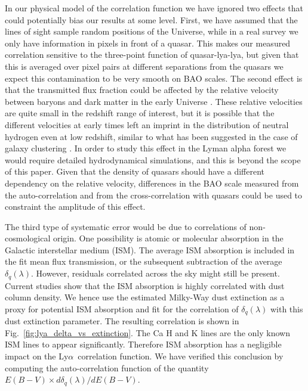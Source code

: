\documentclass{aa}
\newcommand{\dqlam}{\delta_q(\lambda)}
\newcommand{\Lya}{Ly$\alpha$~}
\begin{document}
In our physical model of the correlation function
we have ignored two effects that could potentially bias our results
at some level.
First, we have assumed that the lines of sight sample random positions
of the Universe, while in a real survey we only have information
in pixels in front of a quasar.
This makes our measured correlation sensitive to the three-point
function of quasar-lya-lya,
but given that this is averaged over pixel pairs at
different separations from the quasars we expect this
contamination to be very smooth on BAO scales. 
The second effect is that the transmitted flux fraction
could be affected by the relative velocity between baryons and
dark matter in the early Universe \citep{2010PhRvD..82h3520T}.
These relative velocities are quite small in the redshift range of interest,
but it is possible that the different velocities at early times left an
imprint in the distribution of neutral hydrogen even at low redshift,
similar to what has been suggested in the case of galaxy clustering
\citep{2010JCAP...11..007D,2011JCAP...07..018Y,2016PhRvL.116l1303B}.
In order to study this effect in the Lyman alpha forest we would
require detailed hydrodynamical simulations, and this is beyond
the scope of this paper. Given that the density of quasars should
have a different dependency on the relative velocity, differences
in the BAO scale measured from the auto-correlation and from the
cross-correlation with quasars \citep{2014JCAP...05..027F}
could be
used to constraint the amplitude of this effect.


The third type of systematic
error would be due to correlations of non-cosmological origin.
One possibility is
atomic or molecular absorption in the Galactic interstellar medium (ISM). 
The average ISM absorption is included in the fit mean flux transmission, 
or the subsequent subtraction of the average $\dqlam$.
However, residuals correlated across the sky might still be present. 
Current studies show that the ISM
 absorption is highly correlated with dust column density. 
We hence use the estimated Milky-Way dust extinction 
as a proxy for potential ISM absorption and fit for the 
correlation of 
$\dqlam$
with this dust
extinction parameter.
The resulting correlation is shown in Fig.~\ref{fig:lya_delta_vs_extinction}. 
The Ca H and K lines are the only known ISM lines to appear significantly. 
Therefore ISM absorption 
has a negligible impact on the \Lya correlation function. 
We have verified this conclusion
by computing the auto-correlation function of the quantity 
$E(B-V) \times d\dqlam/d E(B-V)$.
\end{document}
